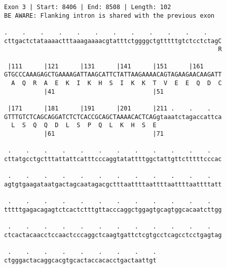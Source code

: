\documentclass{article}
\begin{document}
\begin{Verbatim}
Exon 3 | Start: 8406 | End: 8508 | Length: 102
BE AWARE: Flanking intron is shared with the previous exon
 
.    .    .    .    .    .    .    .    .    .    .    .    
cttgactctataaaactttaaagaaaacgtatttctggggctgtttttgtctcctctagC
                                                           R
  
 |111      |121      |131      |141      |151      |161     
GTGCCCAAAGAGCTGAAAAGATTAAGCATTCTATTAAGAAAACAGTAGAAGAACAAGATT
  A  Q  R  A  E  K  I  K  H  S  I  K  K  T  V  E  E  Q  D  C
           |41                           |51                
  
 |171      |181      |191      |201      |211 .    .    .   
GTTTGTCTCAGCAGGATCTCTCACCGCAGCTAAAACACTCAGgtaaatctagaccattca
  L  S  Q  Q  D  L  S  P  Q  L  K  H  S  E                  
           |61                           |71                
  
 .    .    .    .    .    .    .    .    .    .    .    .   
cttatgcctgctttattattcatttcccaggtatattttggctattgttctttttcccac
  
 .    .    .    .    .    .    .    .    .    .    .    .   
agtgtgaagataatgactagcaatagacgctttaattttaattttaattttaattttatt
  
 .    .    .    .    .    .    .    .    .    .    .    .   
tttttgagacagagtctcactctttgttacccaggctggagtgcagtggcacaatcttgg
  
 .    .    .    .    .    .    .    .    .    .    .    .   
ctcactacaacctccaactcccaggctcaagtgattctcgtgcctcagcctcctgagtag
  
 .    .    .    .    .    .    .    .    .
ctgggactacaggcacgtgcactaccacacctgactaattgt
\end{Verbatim}
\newpage
\end{document}
